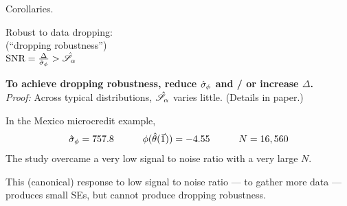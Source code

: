 \begin{frame}[t]{Corollaries.}

\begin{center}
    Robust to data dropping:\\
    (``dropping robustness'')\\
    \vspace{1em}
    $\textrm{SNR} = \frac{\Delta}{\hat\sigma_{\phi}} > \hat{\mathscr{S}}_\alpha$
\end{center}

\textbf{To achieve dropping robustness,
reduce $\hat\sigma_{\phi}$ and / or increase $\Delta$.\\}
\textit{Proof: }
Across typical distributions, $\hat{\mathscr{S}}_\alpha$ varies little.
(Details in paper.)

\vspace{1em}

\hrulefill

\vspace{1em}
In the Mexico microcredit example,
%
\begin{align*}
%
\noise = \MxNoise
\quad\quad\quad
\thetafun(\thetahat(\onevec)) = \MxBetahat
\quad\quad\quad
N = \MxNobs
%
\end{align*}
%
The study overcame a very low signal to noise ratio with a very large $N$.

\vspace{1em} This (canonical) response to low signal to noise ratio --- to
gather more data --- produces small SEs, but cannot produce dropping
robustness.

\end{frame}
